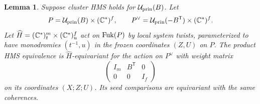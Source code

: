 \documentclass[12pt, letter]{amsart}
\newtheorem{lemma}[theorem]{Lemma}
\theoremstyle{definition}
\newcommand{\pr}{\mathrm{prin}}
\numberwithin{equation}{section}
\begin{document}
\begin{lemma}
\label{lem:frozen-equivariance}
Suppose  cluster HMS holds for $\cU_{\pr}(B)$.  Let
\[
 P=\cU_{\pr}(B)\times(\C^*)^f,\qquad
 P^\vee=\mathcal{U}_{\pr}(-B^{\mathsf T})\times(\C^*)^f.
\]
Let
$\widehat H=(\mathbb C^*)^m_t\times(\mathbb C^*)^f_u$ act on $\operatorname{Fuk}(P)$ by local system twists, parameterized to have monodromies
$(t^{-1},u)$ in the frozen coordinates $(Z,U)$ on $P$.
The product HMS equivalence is $\widehat H$-equivariant for
the action on $P^\vee$ with weight matrix
\begin{equation}\label{eq:all-frozen-weights}
 \begin{pmatrix}
 I_m&B^{\mathsf T}&0\\
 0&0&I_f
 \end{pmatrix}
\end{equation}
on its coordinates $(X;Z;U)$. Its seed comparisons are
equivariant with the same coherences.
\end{lemma}
\end{document}
